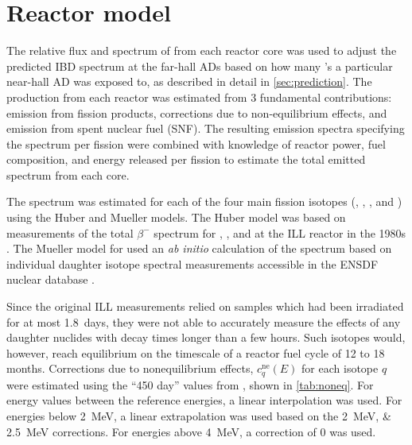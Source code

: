 \section{Reactor model}
\label{sec:reactor}

The relative flux and spectrum of \nuebar{} from each reactor core was used
to adjust the predicted IBD spectrum at the far-hall ADs
based on how many \nuebar{}'s a particular near-hall AD was exposed to,
as described in detail in \cref{sec:prediction}.
The \nuebar{} production from each reactor was estimated from 3 fundamental contributions:
emission from fission products, corrections due to non-equilibrium effects,
and emission from spent nuclear fuel (SNF).
The resulting emission spectra specifying the spectrum per fission
were combined with knowledge of reactor power, fuel composition,
and energy released per fission
to estimate the total emitted \nuebar{} spectrum from each core.

The \nuebar{} spectrum was estimated for each of the four main fission isotopes
(, , , and )
using the Huber \cite{reactor_huber} and Mueller \cite{reactor_mueller} models.
The Huber model was based on measurements of the total $\beta^{-}$ spectrum
for , , and 
at the ILL reactor in the 1980s
\cite{ill_1,ill_2,ill_3}.
The Mueller model for  used an \emph{ab initio} calculation
of the \nuebar{} spectrum
based on individual daughter isotope spectral measurements
accessible in the ENSDF nuclear database \cite{ensdf}.

Since the original ILL measurements relied on samples
which had been irradiated for at most 1.8~days,
they were not able to accurately measure
the effects of any daughter nuclides with decay times longer than a few hours.
Such isotopes would, however, reach equilibrium on the timescale
of a reactor fuel cycle of 12 to 18 months.
Corrections due to nonequilibrium effects, $c^{\text{ne}}_q(E)$
for each isotope $q$
were estimated using the ``450 day'' values from \cite{reactor_mueller},
shown in \cref{tab:noneq}.
For energy values between the reference energies,
a linear interpolation was used.
For energies below \SI{2}{\MeV}, a linear extrapolation was used
based on the \SIlist{2;2.5}{\MeV} corrections.
For energies above \SI{4}{\MeV}, a correction of 0 was used.

